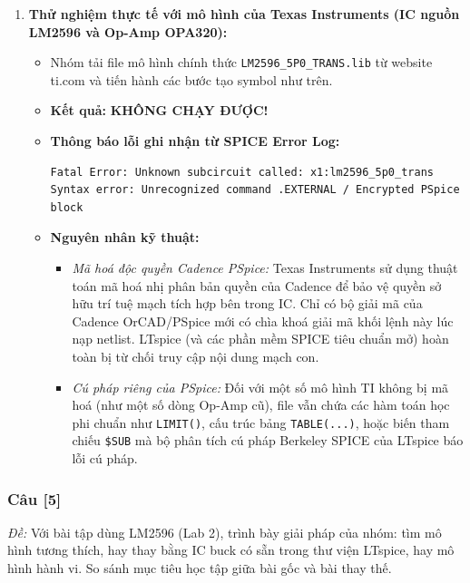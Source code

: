 \documentclass[12pt,a4paper]{article}
\newcommand{\cauhoi}[2]{%
  \subsubsection{Câu [#1]}
  \begin{tcolorbox}[colback=white,colframe=guidegray!70,boxrule=0.4pt,arc=1pt,left=5pt,right=5pt,top=2pt,bottom=2pt]
  \small\textit{Đề:} #2
  \end{tcolorbox}
  \par\vspace{4pt}}
\begin{document}
\begin{enumerate}[label=(\alph*)]
  \item \textbf{Thử nghiệm thực tế với mô hình của Texas Instruments (IC nguồn LM2596 và Op-Amp OPA320):}
  \begin{itemize}
    \item Nhóm tải file mô hình chính thức \texttt{LM2596\_5P0\_TRANS.lib} từ website ti.com và tiến hành các bước tạo symbol như trên.
    \item \textbf{Kết quả:} \textbf{KHÔNG CHẠY ĐƯỢC!}
    \item \textbf{Thông báo lỗi ghi nhận từ SPICE Error Log:}
{\small
\begin{verbatim}
Fatal Error: Unknown subcircuit called: x1:lm2596_5p0_trans
Syntax error: Unrecognized command .EXTERNAL / Encrypted PSpice block
\end{verbatim}
}
    \item \textbf{Nguyên nhân kỹ thuật:}
    \begin{itemize}
      \item \textit{Mã hoá độc quyền Cadence PSpice:} Texas Instruments sử dụng thuật toán mã hoá nhị phân bản quyền của Cadence để bảo vệ quyền sở hữu trí tuệ mạch tích hợp bên trong IC. Chỉ có bộ giải mã của Cadence OrCAD/PSpice mới có chìa khoá giải mã khối lệnh này lúc nạp netlist. LTspice (và các phần mềm SPICE tiêu chuẩn mở) hoàn toàn bị từ chối truy cập nội dung mạch con.
      \item \textit{Cú pháp riêng của PSpice:} Đối với một số mô hình TI không bị mã hoá (như một số dòng Op-Amp cũ), file vẫn chứa các hàm toán học phi chuẩn như \texttt{LIMIT()}, cấu trúc bảng \texttt{TABLE(...)}, hoặc biến tham chiếu \texttt{\$SUB} mà bộ phân tích cú pháp Berkeley SPICE của LTspice báo lỗi cú pháp.
    \end{itemize}
  \end{itemize}
\end{enumerate}

\cauhoi{5}{Với bài tập dùng LM2596 (Lab 2), trình bày giải pháp của nhóm: tìm mô hình tương thích, hay thay bằng IC buck có sẵn trong thư viện LTspice, hay mô hình hành vi. So sánh mục tiêu học tập giữa bài gốc và bài thay thế.}
\end{document}
